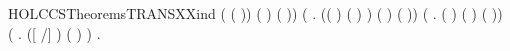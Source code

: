 \begin{SaveVerbatim}{HOLCCSTheoremsTRANSXXind}
              ( ( ))  \HOLSymConst{\HOLTokenImp{}}
             ( \HOLSymConst{\ensuremath{\parallel}} ) \HOLConst{\ensuremath{\tau}} ( \HOLSymConst{\ensuremath{\parallel}} )) \HOLSymConst{\HOLTokenConj{}}
       (\HOLSymConst{\HOLTokenForall{}}    .
                \HOLSymConst{\HOLTokenConj{}}
            (( \HOLSymConst{=} \HOLConst{\ensuremath{\tau}}) \HOLSymConst{\HOLTokenDisj{}} ( \HOLSymConst{=}  ) \HOLSymConst{\HOLTokenConj{}}  \HOLConst{\HOLTokenNotIn{}}  \HOLSymConst{\HOLTokenConj{}}   \HOLConst{\HOLTokenNotIn{}} ) \HOLSymConst{\HOLTokenImp{}}
             (\HOLConst{\ensuremath{\nu}}  )  (\HOLConst{\ensuremath{\nu}}  )) \HOLSymConst{\HOLTokenConj{}}
       (\HOLSymConst{\HOLTokenForall{}}   .
                \HOLSymConst{\HOLTokenImp{}}
             (  ) (  ) (  )) \HOLSymConst{\HOLTokenConj{}}
       (\HOLSymConst{\HOLTokenForall{}}   .
             ([  /] )   \HOLSymConst{\HOLTokenImp{}}  (  )  ) \HOLSymConst{\HOLTokenImp{}}
       \HOLSymConst{\HOLTokenForall{}}  .  \HOLTokenTransBegin{}\HOLTokenTransEnd {} \HOLSymConst{\HOLTokenImp{}}    
\end{SaveVerbatim}
